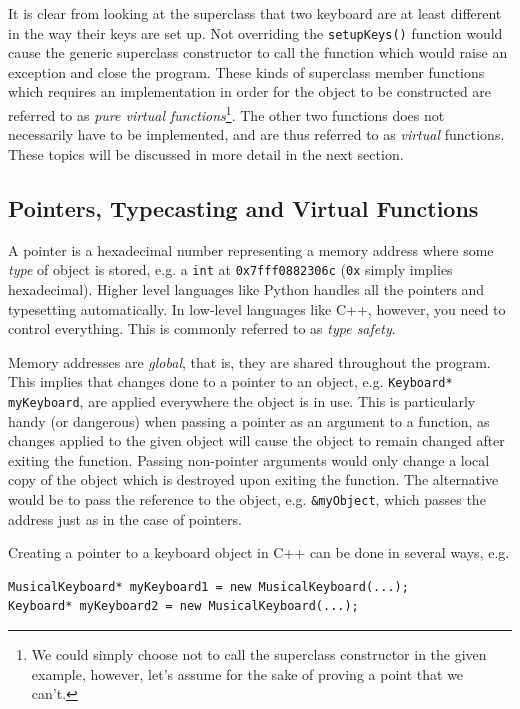 \clearpage


It is clear from looking at the superclass that two keyboard are at least different in the way their keys are set up. Not overriding the \verb+setupKeys()+ function would cause the generic superclass constructor to call the function which would raise an exception and close the program. These kinds of superclass member functions which requires an implementation in order for the object to be constructed are referred to as \textit{pure virtual functions}\footnote{We could simply choose not to call the superclass constructor in the given example, however, let's assume for the sake of proving a point that we can't.}. The other two functions does not necessarily have to be implemented, and are thus referred to as \textit{virtual} functions. These topics will be discussed in more detail in the next section.

\subsection{Pointers, Typecasting and Virtual Functions}

A pointer is a hexadecimal number representing a memory address where some \textit{type} of object is stored, e.g. a \verb+int+ at \verb+0x7fff0882306c+ (\verb+0x+ simply implies hexadecimal). Higher level languages like Python handles all the pointers and typesetting automatically. In low-level languages like C++, however, you need to control everything. This is commonly referred to as \textit{type safety}. 

Memory addresses are \textit{global}, that is, they are shared throughout the program. This implies that changes done to a pointer to an object, e.g. \verb+Keyboard* myKeyboard+, are applied everywhere the object is in use. This is particularly handy (or dangerous) when passing a pointer as an argument to a function, as changes applied to the given object will cause the object to remain changed after exiting the function. Passing non-pointer arguments would only change a local copy of the object which is destroyed upon exiting the function. The alternative would be to pass the reference to the object, e.g. \verb+&myObject+, which passes the address just as in the case of pointers. 

Creating a pointer to a keyboard object in C++ can be done in several ways, e.g. 
\begin{lstlisting}
MusicalKeyboard* myKeyboard1 = new MusicalKeyboard(...);
Keyboard* myKeyboard2 = new MusicalKeyboard(...);
\end{lstlisting}

